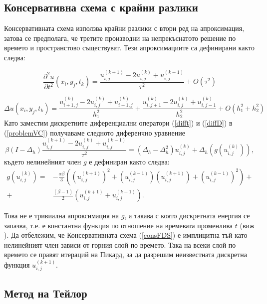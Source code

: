 \documentclass{article}
\newcommand{\be}{\begin{equation}}
\newcommand{\ee}{\end{equation}}
\newcommand{\rf}[1]{(\ref{#1})}
\begin{document}
\subsection{ Консервативна схема с крайни разлики }

Консервативната схема използва крайни разлики с втори ред на апроксимация, затова се предполага, че третите производни на непрекъснатото решение по времето и пространстово съществуват.  Тези апроксимациите са дефинирани както следва:

\be\label{difft}
\frac{\partial^2 u}{\partial t^2}(x_i, y_j, t_k ) = \frac{ u^{(k+1)}_{i, j} - 2u^{(k)}_{i,j} + u^{(k-1)}_{i,j} }{\tau^2} + O(\tau^2) 
\ee

\be\label{diffD}
\Delta u(x_i, y_j, t_k )  = \frac{ u^{(k)}_{i+1, j} - 2u^{(k)}_{i,j} + u^{(k)}_{i-1,j} }{h_1^2} + \frac{ u^{(k)}_{i, j+1} - 2u^{(k)}_{i,j} + u^{(k)}_{i,j-1} }{h_2^2} + O(h_1^2 + h_2^2) 
\ee
Като заместим дискретните диференциални оператори \rf{difft} и \rf{diffD} в \rf{problemVC} получаваме следното диференчно уравнение
\be\label{consFDS}
\beta (I-\Delta_h)\frac{ u^{(k+1)}_{i, j} - 2u^{(k)}_{i,j} + u^{(k-1)}_{i,j} }{\tau^2} = (\Delta_h - \Delta_h^2)u^{(k)}_{i,j} + \Delta_h(g(u^{(k)}_{i,j})),
\ee
%
където нелинейният член $g$ е дефиниран както следва:
\begin{align}
g(u^{(k)}_{i,j})=& -\frac{\alpha \beta} { 3 } \left( (u^{(k+1)}_{i,j})^2 + (u^{(k-1)}_{i,j})(u^{(k+1)}_{i,j}) + (u^{(k-1)}_{i,j})^2 \right) + \nonumber\\
+&\frac{ (\beta - 1 )}{ 2 }\left( u^{(k+1)}_{i,j} + u^{(k-1)}_{i,j} \right).
\end{align}

Това не е тривиална апроксимация на $g$, а такава с която дискретната енергия се запазва, т.е. е константна функция по отношение на времевата променлива $t$ (виж \cite{ref20}). Да отбележим, че Консервативната схема \rf{consFDS} е имплицитна тъй като нелинейният член зависи от горния слой по времето. Така на всеки слой по времето се правят итераций на Пикард, за да разрешим неизвестната дискретна функция $u^{(k+1)}_{i,j}$.

\subsection{ Метод на Тейлор }
\end{document}
